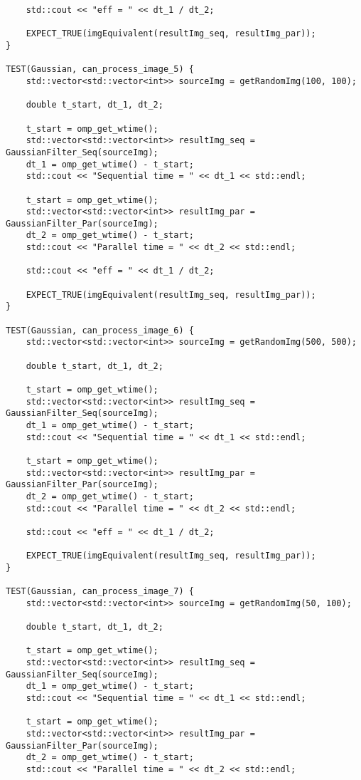 \documentclass{report}
\begin{document}
\begin{lstlisting}
    std::cout << "eff = " << dt_1 / dt_2;

    EXPECT_TRUE(imgEquivalent(resultImg_seq, resultImg_par));
}

TEST(Gaussian, can_process_image_5) {
    std::vector<std::vector<int>> sourceImg = getRandomImg(100, 100);

    double t_start, dt_1, dt_2;

    t_start = omp_get_wtime();
    std::vector<std::vector<int>> resultImg_seq = GaussianFilter_Seq(sourceImg);
    dt_1 = omp_get_wtime() - t_start;
    std::cout << "Sequential time = " << dt_1 << std::endl;

    t_start = omp_get_wtime();
    std::vector<std::vector<int>> resultImg_par = GaussianFilter_Par(sourceImg);
    dt_2 = omp_get_wtime() - t_start;
    std::cout << "Parallel time = " << dt_2 << std::endl;

    std::cout << "eff = " << dt_1 / dt_2;

    EXPECT_TRUE(imgEquivalent(resultImg_seq, resultImg_par));
}

TEST(Gaussian, can_process_image_6) {
    std::vector<std::vector<int>> sourceImg = getRandomImg(500, 500);

    double t_start, dt_1, dt_2;

    t_start = omp_get_wtime();
    std::vector<std::vector<int>> resultImg_seq = GaussianFilter_Seq(sourceImg);
    dt_1 = omp_get_wtime() - t_start;
    std::cout << "Sequential time = " << dt_1 << std::endl;

    t_start = omp_get_wtime();
    std::vector<std::vector<int>> resultImg_par = GaussianFilter_Par(sourceImg);
    dt_2 = omp_get_wtime() - t_start;
    std::cout << "Parallel time = " << dt_2 << std::endl;

    std::cout << "eff = " << dt_1 / dt_2;

    EXPECT_TRUE(imgEquivalent(resultImg_seq, resultImg_par));
}

TEST(Gaussian, can_process_image_7) {
    std::vector<std::vector<int>> sourceImg = getRandomImg(50, 100);

    double t_start, dt_1, dt_2;

    t_start = omp_get_wtime();
    std::vector<std::vector<int>> resultImg_seq = GaussianFilter_Seq(sourceImg);
    dt_1 = omp_get_wtime() - t_start;
    std::cout << "Sequential time = " << dt_1 << std::endl;

    t_start = omp_get_wtime();
    std::vector<std::vector<int>> resultImg_par = GaussianFilter_Par(sourceImg);
    dt_2 = omp_get_wtime() - t_start;
    std::cout << "Parallel time = " << dt_2 << std::endl;


\end{lstlisting}
\end{document}
